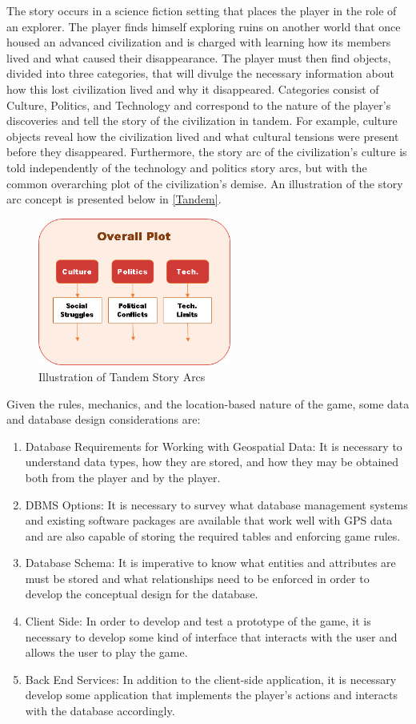 \documentclass[conference]{IEEEtran}
\begin{document}
The story occurs in a science fiction setting that places the player in the role of an explorer. The player finds himself exploring ruins on another world that once housed an advanced civilization and is charged with learning how its members lived and what caused their disappearance. The player must then find objects, divided into three categories, that will divulge the necessary information about how this lost civilization lived and why it disappeared. Categories consist of Culture, Politics, and Technology and correspond to the nature of the player’s discoveries and tell the story of the civilization in tandem. For example, culture objects reveal how the civilization lived and what cultural tensions were present before they disappeared. Furthermore, the story arc of the civilization’s culture is told independently of the technology and politics story arcs, but with the common overarching plot of the civilization’s demise. An illustration of the story arc concept is presented below in \autoref{Tandem}.

\begin{figure}[h]
\centering
\includegraphics[width=2.5in]{imgs/TandemPlot2.png}
\caption{Illustration of Tandem Story Arcs}
\label{Tandem}
\end{figure}

Given the rules, mechanics, and the location-based nature of the game, some data and database design considerations are:

\begin{enumerate}
	\item Database Requirements for Working with Geospatial Data: It is necessary to understand data types, how they are stored, and how they may be obtained both from the player and by the player. 
	\item DBMS Options: It is necessary to survey what database management systems and existing software packages are available that work well with GPS data and are also capable of storing the required tables and enforcing game rules.
	\item Database Schema: It is imperative to know what entities and attributes are must be stored and what relationships need to be enforced in order to develop the conceptual design for the database.
	\item Client Side: In order to develop and test a prototype of the game, it is necessary to develop some kind of interface that interacts with the user and allows the user to play the game.
	\item Back End Services: In addition to the client-side application, it is necessary develop some application that implements the player’s actions and interacts with the database accordingly.

\end{enumerate}
\end{document}
